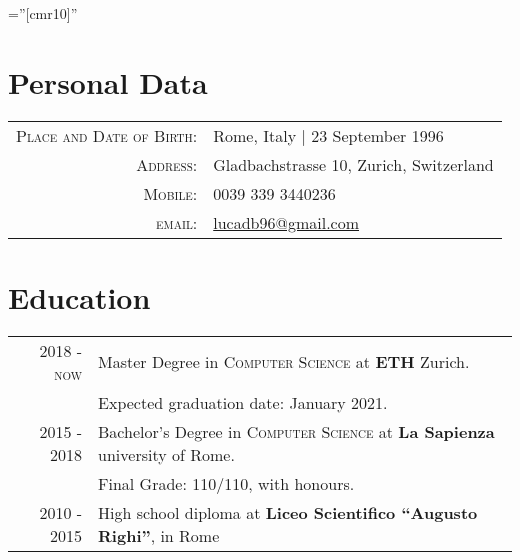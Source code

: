 \documentclass[a4paper,10pt]{article} %
\begin{document}
\pagestyle{empty} %

\font\fb=''[cmr10]'' %

\bigskip
\bigskip

\par{\bigskip\par} %

\section{Personal Data}

\begin{tabular}{rl}
\textsc{Place and Date of Birth:} & Rome, Italy  | 23 September 1996 \\
\textsc{Address:} & Gladbachstrasse 10, Zurich, Switzerland\\
\textsc{Mobile:} & 0039 339 3440236\\
\textsc{email:} & \href{lucadb96@gmail.com}{lucadb96@gmail.com}
\end{tabular}

\bigskip

\section{Education}
\begin{tabular}{rl}
\textsc{2018 - now} & Master Degree in \textsc{Computer Science} at \textbf{ETH} Zurich.\\
&Expected graduation date: January 2021.\\
\textsc{2015 - 2018} & Bachelor's Degree in \textsc{Computer Science} at \textbf{La Sapienza} university of Rome.\\
&Final Grade: 110/110, with honours.\\
\textsc{2010 - 2015} & High school diploma at \textbf{Liceo Scientifico ``Augusto Righi''}, in Rome
\end{tabular}

\bigskip
\end{document}
